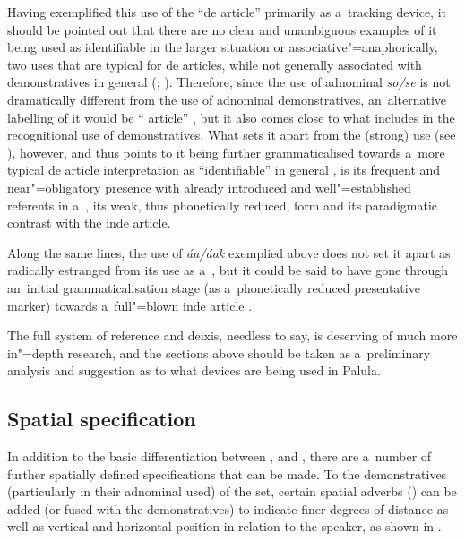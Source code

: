 Having exemplified this use of the ``de article'' primarily as a~tracking device, it should be pointed out that there are no clear and unambiguous examples of it being used as identifiable in the larger situation or associative"=anaphorically, two uses that are typical for de articles, while not generally associated with demonstratives in general (\citealt[485]{juvonen2006}; \citealt[233]{himmelmann1996}). Therefore, since the use of adnominal \textit{so/se} is not dramatically different from the  use of adnominal demonstratives, an~alternative labelling of it would be `` article'' \citep[486]{juvonen2006}, but it also comes close to what \citet[230--239]{himmelmann1996} includes in the recognitional use of demonstratives. What sets it apart from the (strong)  use (see ), however, and thus points to it being further grammaticalised towards a~more typical de article interpretation as ``identifiable'' in general \citep[485]{juvonen2006}, is its frequent and near"=obligatory presence with already introduced and well"=established referents in a~, its weak, thus phonetically reduced, form and its paradigmatic contrast with the inde article.


Along the same lines, the use of \textit{áa/áak} exemplied above does not set it apart as radically estranged from its use as a~, but it could be said to have gone through an~initial grammaticalisation stage (as a~phonetically reduced presentative marker) towards a~full"=blown inde article \citep[486]{juvonen2006}.



The full system of reference and deixis, needless to say, is deserving of much more in"=depth research, and the sections above should be taken as a~preliminary analysis and suggestion as to what devices are being used in Palula.


\subsection{Spatial specification}
\label{subsec:5-2-7}

In addition to the basic differentiation between ,  and , there are a~number of further spatially defined specifications that can be made. To the demonstratives (particularly in their adnominal used) of the  set, certain spatial adverbs () can be added (or fused with the demonstratives) to indicate finer degrees of distance as well as vertical and horizontal position in relation to the speaker, as shown in .


